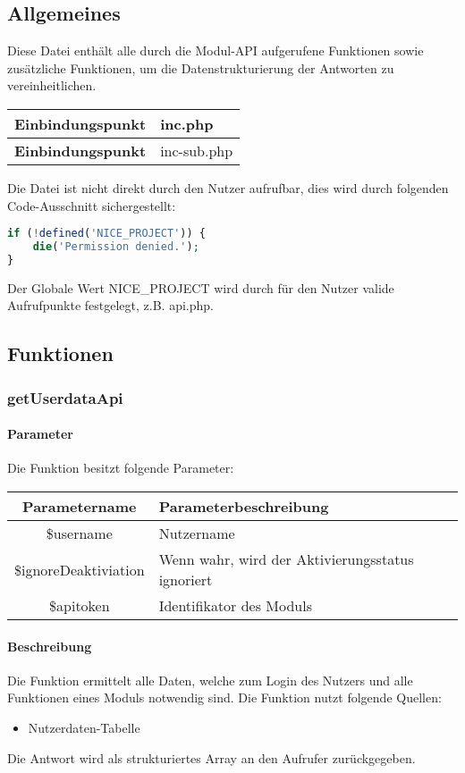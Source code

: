 \subsection{Allgemeines} Diese Datei enthält alle durch die Modul-API aufgerufene Funktionen sowie zusätzliche Funktionen, um die Datenstrukturierung der Antworten zu vereinheitlichen.
\begin{table}[H]
	\begin{tabular}{|c|p{11cm}|}
		\hline
		\textbf{Einbindungspunkt} & inc.php \\ \hline
		\textbf{Einbindungspunkt} & inc-sub.php \\ \hline
	\end{tabular}
\end{table}
Die Datei ist nicht direkt durch den Nutzer aufrufbar, dies wird durch folgenden Code-Ausschnitt sichergestellt:
\begin{lstlisting}[language=php]
if (!defined('NICE_PROJECT')) {
	die('Permission denied.');
}
\end{lstlisting}
Der Globale Wert {\glqq NICE\_PROJECT\grqq} wird durch für den Nutzer valide Aufrufpunkte festgelegt, z.B. {\glqq api.php\grqq}.
\newpage
\subsection{Funktionen}
\subsubsection{getUserdataApi}
\paragraph{Parameter} Die Funktion besitzt folgende Parameter:
\begin{table}[H]
	\begin{tabular}{|c|p{11cm}|}
		\hline
		\textbf{Parametername} & \textbf{Parameterbeschreibung} \\ \hline
		\$username            & Nutzername \\ \hline
		\$ignoreDeaktiviation & Wenn wahr, wird der Aktivierungsstatus ignoriert \\ \hline
		\$apitoken            & Identifikator des Moduls \\ \hline
	\end{tabular}
\end{table}
\paragraph{Beschreibung} Die Funktion ermittelt alle Daten, welche zum Login des Nutzers und alle Funktionen eines Moduls notwendig sind. Die Funktion nutzt folgende Quellen:
\begin{itemize}
	\item Nutzerdaten-Tabelle
\end{itemize}
Die Antwort wird als strukturiertes Array an den Aufrufer zurückgegeben.
